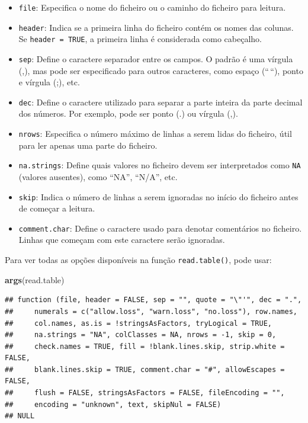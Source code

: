 \documentclass[
]{book}
\newenvironment{Shaded}{\begin{snugshade}}{\end{snugshade}}
\newcommand{\FunctionTok}[1]{\textcolor[rgb]{0.13,0.29,0.53}{\textbf{#1}}}
\newcommand{\NormalTok}[1]{#1}
\providecommand{\tightlist}{%
  \setlength{\itemsep}{0pt}\setlength{\parskip}{0pt}}
\begin{document}
\begin{itemize}
\tightlist
\item
  \texttt{file}: Especifica o nome do ficheiro ou o caminho do ficheiro para
  leitura.
\item
  \texttt{header}: Indica se a primeira linha do ficheiro contém os nomes das
  colunas. Se \texttt{header\ =\ TRUE}, a primeira linha é considerada como
  cabeçalho.
\item
  \texttt{sep}: Define o caractere separador entre os campos. O padrão é uma
  vírgula (,), mas pode ser especificado para outros caracteres, como
  espaço (``\,``), ponto e vírgula (;), etc.
\item
  \texttt{dec}: Define o caractere utilizado para separar a parte inteira da
  parte decimal dos números. Por exemplo, pode ser ponto (.) ou
  vírgula (,).
\item
  \texttt{nrows}: Especifica o número máximo de linhas a serem lidas do
  ficheiro, útil para ler apenas uma parte do ficheiro.
\item
  \texttt{na.strings}: Define quais valores no ficheiro devem ser
  interpretados como \texttt{NA} (valores ausentes), como ``NA'', ``N/A'', etc.
\item
  \texttt{skip}: Indica o número de linhas a serem ignoradas no início do
  ficheiro antes de começar a leitura.
\item
  \texttt{comment.char}: Define o caractere usado para denotar comentários no
  ficheiro. Linhas que começam com este caractere serão ignoradas.
\end{itemize}

Para ver todas as opções disponíveis na função \texttt{read.table()}, pode
usar:

\begin{Shaded}
\begin{Highlighting}[]
\FunctionTok{args}\NormalTok{(read.table)}
\end{Highlighting}
\end{Shaded}

\begin{verbatim}
## function (file, header = FALSE, sep = "", quote = "\"'", dec = ".", 
##     numerals = c("allow.loss", "warn.loss", "no.loss"), row.names, 
##     col.names, as.is = !stringsAsFactors, tryLogical = TRUE, 
##     na.strings = "NA", colClasses = NA, nrows = -1, skip = 0, 
##     check.names = TRUE, fill = !blank.lines.skip, strip.white = FALSE, 
##     blank.lines.skip = TRUE, comment.char = "#", allowEscapes = FALSE, 
##     flush = FALSE, stringsAsFactors = FALSE, fileEncoding = "", 
##     encoding = "unknown", text, skipNul = FALSE) 
## NULL
\end{verbatim}
\end{document}
